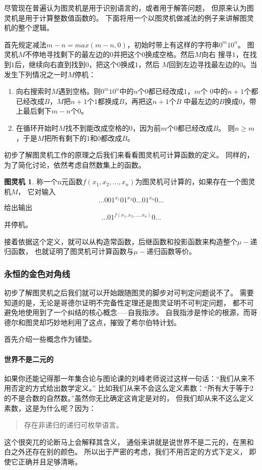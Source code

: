 \documentclass[12pt,a4paper,oneside]{ctexrep}
\theoremstyle{definition}
\newtheorem{tm}{图灵机}
\begin{document}
尽管现在普遍认为图灵机是用于识别语言的，或者用于解答问题，
但原来认为图灵机是用于计算整数值函数的。
下面将用一个以图灵机做减法的例子来讲解图灵机的整个逻辑。

首先规定减法$m-n=max(m-n,0)$，初始时带上有这样的字符串$0^m10^n$。
图灵机$M$不停地寻找剩下的最左边的0并把这个0换成空格。然后$M$向右
搜寻$1$，在找到$1$后，继续向右直到找到$0$，把这个$0$换成$1$，然后
$M$回到左边寻找最左边的$0$。当发生下列情况之一时$M$停机：
\begin{enumerate}
\item 向右搜索时$M$遇到空格。则$0^m10^n$中的$n$个$0$都已经改成$1$，$m$个
$0$中的$n+1$个都已经改成$B$，$M$把$n+1$个$1$都换成$B$，再把这$n+1$个$B$
中最左边的$B$换成$0$，带上最后剩下$m-n$个0。
\item 在循环开始时$M$找不到能改成空格的$0$，因为前$m$个$0$都已经改成$B$。
则$n \geq m$，于是$M$把所有剩下的$1$和$0$都改成$B$。
\end{enumerate}

初步了解图灵机工作的原理之后我们来看看图灵机可计算函数的定义。
同样的，为了简化讨论，依然考虑自然数集上的函数。

\begin{tm}
称一个n元函数$f(x_1,x_2,\ldots,x_n)$为图灵机可计算的，如果存在一个图灵机$M$，
它对输入
\begin{equation}
\ldots 001^{x_1}01^{x_2}0\ldots01^{x_n}0\ldots
\end{equation}
给出输出
\begin{equation}
\ldots01^{f(x_1,x_2,\ldots,x_n)}0\ldots
\end{equation}
并停机。
\end{tm}
接着依据这个定义，就可以从构造常函数，后继函数和投影函数来构造整个$\mu-$递归函数，
也就证明了图灵机可计算函数与$\mu-$递归函数等价。

\subsubsection{永恒的金色对角线}
初步了解图灵机之后我们就可以开始跟随图灵的脚步对可判定问题说不了。
需要知道的是，无论是哥德尔证明不完备性定理还是图灵证明不可判定问题，
都不可避免地使用到了一个纠结的核心概念-----自我指涉。
自我指涉是悖论的根源，而哥德尔和图灵却巧妙地利用了这点，摧毁了希尔伯特计划。

首先介绍一些概念作为铺垫。

\paragraph{世界不是二元的}
如果你还能记得那一年集合论与图论课的刘峰老师说过这样一句话：“我们从来不用否定的方式给出数学定义。”
比如我们从来不会这么定义素数：“所有大于等于2的不是合数的自然数。”虽然你无比确定这肯定是对的，
但我们却从来不这么定义素数，这是为什么呢？因为：
\begin{quote}
存在非递归的递归可枚举语言。
\end{quote}
这个很突兀的论断马上会解释其含义，
通俗来讲就是说世界不是二元的，在黑和白之外还存在别的颜色。
所以出于严密的考虑，我们不用否定的方式下定义，
即使它正确并且足够清晰。
\end{document}
